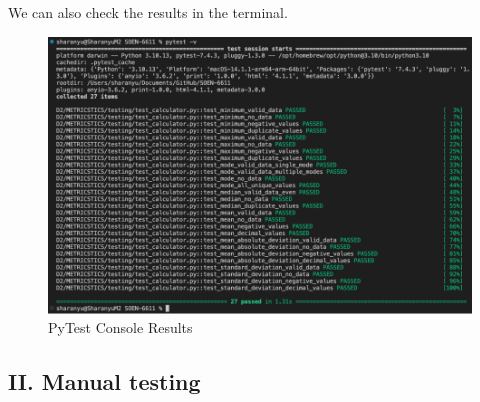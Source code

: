 \documentclass[english,12pt,a4paper]{report}
\begin{document}
	We can also check the results in the terminal.
	
	\begin{figure}[H]
		\centering
		\includegraphics[width=0.8\linewidth]{images/pytest_terminal_results.png}
		\caption{PyTest Console Results}
		\label{fig:PyTest Console Results}
	\end{figure}
	
	\vspace{120pt}
	
	\subsection*{II. Manual testing}
	
\end{document}
